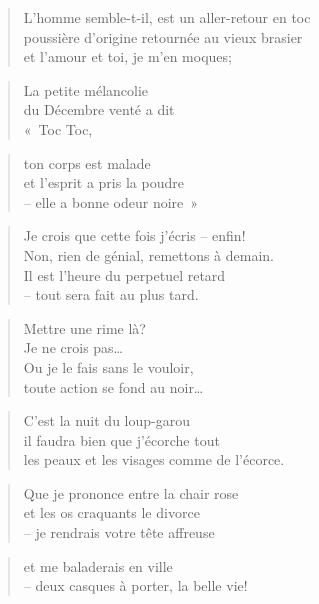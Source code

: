   \begin{verse}
    L’homme semble-t-il, est un aller-retour en toc\\
    poussière d’origine retournée au vieux brasier\\
    et l’amour et toi, je m’en moques;
  \end{verse}
  \begin{verse}
    La petite mélancolie\\
    du Décembre venté a dit\\
    «~Toc Toc,
  \end{verse}
  \begin{verse}
    ton corps est malade\\
    et l’esprit a pris la poudre\\
    -- elle a bonne odeur noire~»
  \end{verse}
  \begin{verse}
    Je crois que cette fois j’écris -- enfin!\\
    Non, rien de génial, remettons à demain.\\
    Il est l’heure du perpetuel retard\\
    -- tout sera fait au plus tard.
  \end{verse}
  \begin{verse}
    Mettre une rime là?\\
    Je ne crois pas…\\
    Ou je le fais sans le vouloir,\\
    toute action se fond au noir…
  \end{verse}
  \begin{verse}
    C’est la nuit du loup-garou\\
    il faudra bien que j’écorche tout\\
    les peaux et les visages comme de l’écorce.
  \end{verse}
  \begin{verse}
    Que je prononce entre la chair rose\\
    et les os craquants le divorce\\
    -- je rendrais votre tête affreuse
  \end{verse}
  \begin{verse}
    et me baladerais en ville\\
    -- deux casques à porter, la belle vie!
  \end{verse}
